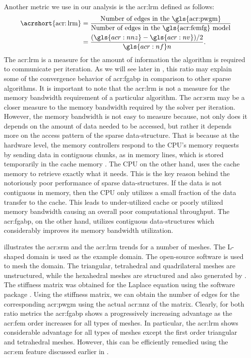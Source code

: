 Another metric we use in our analysis is the \gls{acr:lrm} defined as follows:
\begin{align}
	\OpN{\acrshort{acr:lrm}} & = \frac{\text{Number of edges in the \gls{acr:pwgm}}}{\text{Number of edges in the \gls{acr:femfg} model}}\\
	& = \frac{(\gls{acr:nnz}-\gls{acr:nv})/2}{\gls{acr:nf} n}.
\end{align}
The \gls{acr:lrm} is a measure for the amount of information the algorithm is required to communicate per iteration.
As we will see later in , this ratio may explain some of the convergence behavior of \gls{acr:fgabp} in comparison to other sparse algorithms.
It is important to note that the \gls{acr:lrm} is not a measure for the memory bandwidth requirement of a particular algorithm.
The \gls{acr:srm} may be a closer measure to the memory bandwidth required by the solver per iteration.
However, the memory bandwidth is not easy to measure because, not only does it depends on the amount of data needed to be accessed, but rather it depends more on the access pattern of the sparse data-structure.
That is because at the hardware level, the memory controllers respond to the CPU's memory requests by sending data in contiguous chunks, as in memory lines, which is stored temporarily in the cache memory \cite{bib:Hennessy2012CAQA}. 
The CPU on the other hand, uses the cache memory to retrieve exactly what it needs.
This is the key reason behind the notoriously poor performance of sparse data-structures.
If the data is not contiguous in memory, then the CPU only utilizes a small fraction of the data transfer to the cache.
This leads to under-utilized cache or poorly utilized memory bandwidth causing an overall poor computational throughput.
The \gls{acr:fgabp}, on the other hand, utilizes contiguous data-structures which considerably improves its memory bandwidth utilization.

 illustrates the \gls{acr:srm} and the \gls{acr:lrm} trends for a number of meshes.
The L-shaped domain is used as the example domain.
The open-source software  \cite{bib:gmsh2009} is used to mesh the domain.
The triangular, tetrahedral and quadrilateral meshes are unstructured, while the hexahedral meshes are structured and also generated by .
The stiffness matrix was obtained for the Laplace equation using the software package  \cite{bib:getfem}.
Using the stiffness matrix, we can obtain the number of edges for the corresponding \gls{acr:pwgm} using the actual \gls{acr:nnz} of the matrix.
Clearly, for both ratio metrics the \gls{acr:fgabp} shows a progressively increasing advantage as the \gls{acr:fem} order increases for all types of meshes.
In particular, the \gls{acr:lrm} shows considerable advantage for all types of meshes except the first order triangular and tetrahedral meshes.
However, this can be efficiently remedied using the \gls{acr:em} feature discussed earlier in .

